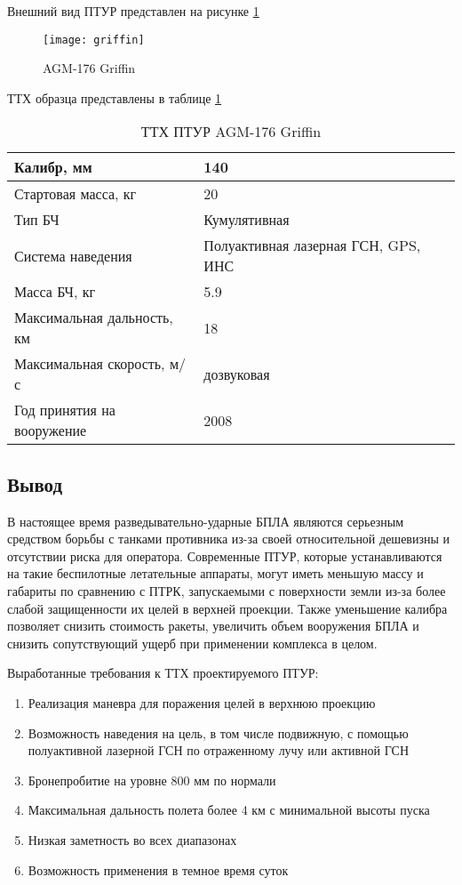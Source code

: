 Внешний вид ПТУР представлен на рисунке \ref{fig:griffin1}
\begin{figure}[!h]
	\texttt{[image: griffin]}
	\caption{AGM-176 Griffin}
	\label{fig:griffin1}
\end{figure}

ТТХ образца представлены в таблице \ref{tab:griffin_stats}
\begin{table}[!h]
	\begin{center}
		\caption{ТТХ ПТУР AGM-176 Griffin}
		\begin{tabular}{|l|l|}
  		\hline
		Калибр, мм & 140 \\ \hline
		Стартовая масса, кг & 20 \\ \hline
		Тип БЧ & Кумулятивная \\ \hline
		Система наведения & Полуактивная лазерная ГСН, GPS, ИНС \\ \hline
		Масса БЧ, кг & 5.9 \\ \hline
		Максимальная дальность, км & 18 \\ \hline
		Максимальная скорость, м/с & дозвуковая \\ \hline
		Год принятия на вооружение & 2008 \\ \hline
		\end{tabular}
		\label{tab:griffin_stats}
	\end{center}
\end{table}
\subsection{Вывод}
В настоящее время разведывательно-ударные БПЛА являются серьезным средством борьбы с танками противника из-за своей относительной дешевизны и отсутствии риска для оператора. Современные ПТУР, которые устанавливаются на такие беспилотные летательные аппараты, могут иметь меньшую массу и габариты по сравнению с ПТРК, запускаемыми с поверхности земли из-за более слабой защищенности их целей в верхней проекции. Также уменьшение калибра позволяет снизить стоимость ракеты, увеличить объем вооружения БПЛА и снизить сопутствующий ущерб при применении комплекса в целом.

Выработанные требования к ТТХ проектируемого ПТУР:
\begin{enumerate}[1.]
	\item Реализация маневра для поражения целей в верхнюю проекцию
	\item Возможность наведения на цель, в том числе подвижную, с помощью полуактивной лазерной ГСН по отраженному лучу или активной ГСН
	\item Бронепробитие на уровне 800 мм по нормали
	\item Максимальная дальность полета более 4 км с минимальной высоты пуска
	\item Низкая заметность во всех диапазонах
	\item Возможность применения в темное время суток
\end{enumerate}


